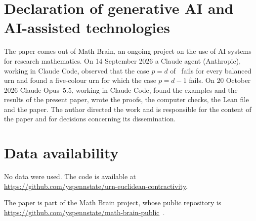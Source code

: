 \documentclass[11pt]{amsart}
\theoremstyle{definition}
\theoremstyle{remark}
\begin{document}
\section*{Declaration of generative AI and AI-assisted technologies}
The paper comes out of Math Brain, an ongoing project on the use of AI systems for research mathematics. On 14 September 2026 a Claude agent (Anthropic), working in Claude Code, observed that the case $p=d$ of~\cite[Remark~3.7]{NP} fails for every balanced urn and found a five-colour urn for which the case $p=d-1$ fails. On 20 October 2026 Claude Opus~5.5, working in Claude Code, found the examples and the results of the present paper, wrote the proofs, the computer checks, the Lean file and the paper. The author directed the work and is responsible for the content of the paper and for decisions concerning its dissemination.

\section*{Data availability}
No data were used. The code is available at\\ \url{https://github.com/yspennstate/urn-euclidean-contractivity}.

The paper is part of the Math Brain project, whose public repository is \url{https://github.com/yspennstate/math-brain-public}~\cite{MathBrainRepo}.
\end{document}
